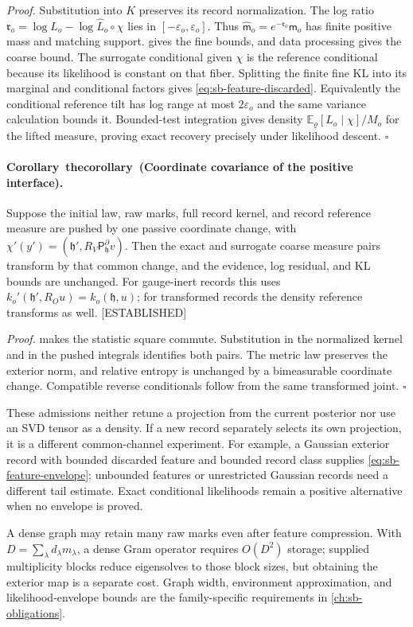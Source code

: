 \documentclass[11pt,letterpaper]{report}
\newcommand{\E}{\mathbb E}
\newcommand{\given}{\mid}
\newcounter{statementsequence}[chapter]
\newcommand{\syncstatementcounter}[1]{\stepcounter{statementsequence}\setcounter{#1}{\numexpr\value{statementsequence}-1\relax}\refstepcounter{#1}}
\newcommand{\resultheading}[4]{\syncstatementcounter{#2}\label{#4}\paragraph{#1~\csname the#2\endcsname\ (#3).}}
\newcommand{\corollaryheading}[2]{\resultheading{Corollary}{corollary}{#1}{#2}}
\newcommand{\status}[1]{\mbox{{\small\textsc{\textcolor{red!45!black}{[#1]}}}}}
\begin{document}
\noindent\emph{Proof.}
Substitution into $K$ preserves its record normalization. The log ratio
${\mathfrak r}_o=\log L_o-\log\widehat L_o\circ\chi$ lies in $[-\varepsilon_o,\varepsilon_o]$. Thus $\widehat{\mathsf m}_o=e^{-{\mathfrak r}_o}\mathsf m_o$ has finite positive mass and matching support.  gives the fine bounds, and data processing gives the coarse bound. The surrogate conditional given $\chi$ is the reference conditional because its likelihood is constant on that fiber. Splitting the finite fine KL into its marginal and conditional factors gives \cref{eq:sb-feature-discarded}. Equivalently the conditional reference tilt has log range at most $2\varepsilon_o$ and the same variance calculation bounds it. Bounded-test integration gives density $\E_\varrho[L_o\given\chi]/M_o$ for the lifted measure, proving exact recovery precisely under likelihood descent. $\square$

\corollaryheading{Coordinate covariance of the positive interface}{cor:sb-interface-covariance}
Suppose the initial law, raw marks, full record kernel, and record reference measure are pushed by one passive coordinate change, with $\chi'(y')=({\mathfrak h}',R_V\mathsf P_{\mathfrak h}^\partial v)$. Then the exact and surrogate coarse measure pairs transform by that common change, and the evidence, log residual, and KL bounds are unchanged. For gauge-inert records this uses $k_o'({\mathfrak h}',R_Ou)=k_o({\mathfrak h},u)$; for transformed records the density reference transforms as well. \status{ESTABLISHED}

\noindent\emph{Proof.}
 makes the statistic square commute. Substitution in the normalized kernel and in the pushed integrals identifies both pairs. The metric law preserves the exterior norm, and relative entropy is unchanged by a bimeasurable coordinate change. Compatible reverse conditionals follow from the same transformed joint. $\square$

These admissions neither retune a projection from the current posterior nor use an SVD tensor as a density. If a new record separately selects its own projection, it is a different common-channel experiment. For example, a Gaussian exterior record with bounded discarded feature and bounded record class supplies \cref{eq:sb-feature-envelope}; unbounded features or unrestricted Gaussian records need a different tail estimate. Exact conditional likelihoods remain a positive alternative when no envelope is proved.

A dense graph may retain many raw marks even after feature compression. With $D=\sum_\lambda d_\lambda m_\lambda$, a dense Gram operator requires $O(D^2)$ storage; supplied multiplicity blocks reduce eigensolves to those block sizes, but obtaining the exterior map is a separate cost. Graph width, environment approximation, and likelihood-envelope bounds are the family-specific requirements in \cref{ch:sb-obligations}.
\end{document}
